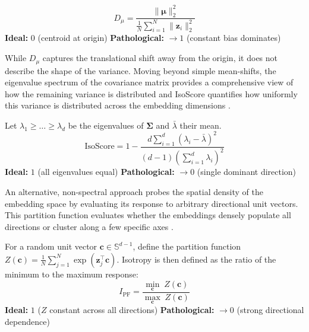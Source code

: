 \begin{metricbox}
\begin{equation}
    D_\mu = \frac{\|\boldsymbol{\mu}\|_2^2}{\frac{1}{N}\sum_{i=1}^N \|\mathbf{z}_i\|_2^2}
    \label{met:mean_dominance_ratio}
\end{equation}
\textbf{Ideal:} $0$ (centroid at origin) \quad \textbf{Pathological:} $\to 1$ (constant bias dominates)
\end{metricbox}

While $D_\mu$ captures the translational shift away from the origin, it does not describe the shape of the variance. Moving beyond simple mean-shifts, the eigenvalue spectrum of the covariance matrix provides a comprehensive view of how the remaining variance is distributed and IsoScore quantifies how uniformly this variance is distributed across the embedding dimensions \cite{rudman-etal-2022-isoscore}.

\begin{metricbox}
Let $\lambda_1 \geq \dots \geq \lambda_d$ be the eigenvalues of $\boldsymbol{\Sigma}$ and $\bar{\lambda}$ their mean. 
\begin{equation}
    \text{IsoScore} = 1 - \frac{d \sum_{i=1}^d (\lambda_i - \bar{\lambda})^2}{(d-1)\left(\sum_{i=1}^d \lambda_i\right)^2}
    \label{met:isoscore}
\end{equation}
\textbf{Ideal:} $1$ (all eigenvalues equal) \quad \textbf{Pathological:} $\to 0$ (single dominant direction)
\end{metricbox}

An alternative, non-spectral approach probes the spatial density of the embedding space by evaluating its response to arbitrary directional unit vectors. This partition function evaluates whether the embeddings densely populate all directions or cluster along a few specific axes \cite{Arora2016_Latent, mu2018allbutthetop}.

\begin{metricbox}
For a random unit vector $\mathbf{c} \in \mathbb{S}^{d-1}$, define the partition function $Z(\mathbf{c}) = \frac{1}{N}\sum_{j=1}^{N} \exp(\mathbf{z}_j^\top \mathbf{c})$. Isotropy is then defined as the ratio of the minimum to the maximum response:
\begin{equation}
    I_{\mathrm{PF}} = \frac{\min_{\mathbf{c}}\; Z(\mathbf{c})}{\max_{\mathbf{c}}\; Z(\mathbf{c})}
    \label{met:partition_function_isotropy}
\end{equation}
\textbf{Ideal:} $1$ ($Z$ constant across all directions) \quad \textbf{Pathological:} $\to 0$ (strong directional dependence)
\end{metricbox}

